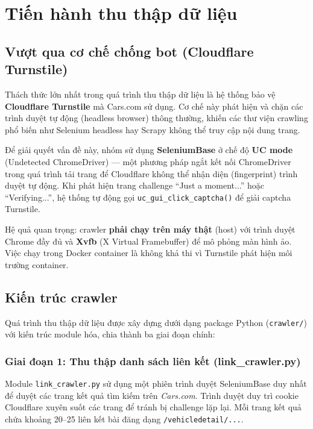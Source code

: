 \section{Tiến hành thu thập dữ liệu}

\subsection{Vượt qua cơ chế chống bot (Cloudflare Turnstile)}

Thách thức lớn nhất trong quá trình thu thập dữ liệu là hệ thống bảo vệ \textbf{Cloudflare Turnstile} mà Cars.com sử dụng. Cơ chế này phát hiện và chặn các trình duyệt tự động (headless browser) thông thường, khiến các thư viện crawling phổ biến như Selenium headless hay Scrapy không thể truy cập nội dung trang.

Để giải quyết vấn đề này, nhóm sử dụng \textbf{SeleniumBase} ở chế độ \textbf{UC mode} (Undetected ChromeDriver) — một phương pháp ngắt kết nối ChromeDriver trong quá trình tải trang để Cloudflare không thể nhận diện (fingerprint) trình duyệt tự động. Khi phát hiện trang challenge ``Just a moment...'' hoặc ``Verifying...'', hệ thống tự động gọi \texttt{uc\_gui\_click\_captcha()} để giải captcha Turnstile.

Hệ quả quan trọng: crawler \textbf{phải chạy trên máy thật} (host) với trình duyệt Chrome đầy đủ và \textbf{Xvfb} (X Virtual Framebuffer) để mô phỏng màn hình ảo. Việc chạy trong Docker container là không khả thi vì Turnstile phát hiện môi trường container.

\subsection{Kiến trúc crawler}

Quá trình thu thập dữ liệu được xây dựng dưới dạng package Python (\texttt{crawler/}) với kiến trúc module hóa, chia thành ba giai đoạn chính:

\subsubsection{Giai đoạn 1: Thu thập danh sách liên kết (link\_crawler.py)}

Module \texttt{link\_crawler.py} sử dụng một phiên trình duyệt SeleniumBase duy nhất để duyệt các trang kết quả tìm kiếm trên \textit{Cars.com}. Trình duyệt duy trì cookie Cloudflare xuyên suốt các trang để tránh bị challenge lặp lại. Mỗi trang kết quả chứa khoảng 20--25 liên kết bài đăng dạng \texttt{/vehicledetail/...}.

